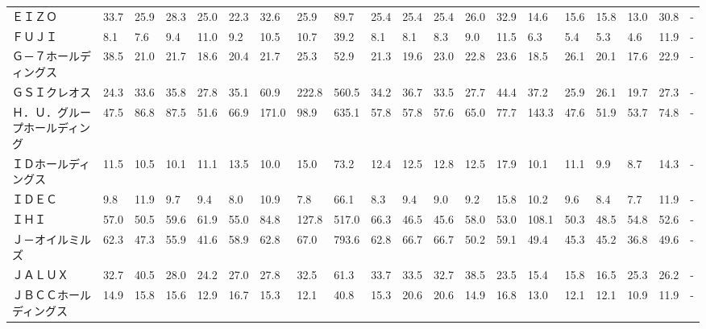\begin{tabular}{llllllllllllllllllll}
ＥＩＺＯ            &   33.7 &   25.9 &      28.3 &      25.0 &       22.3 &    32.6 &    25.9 &     89.7 &    25.4 &    25.4 &   25.4 &   26.0 &    32.9 &    14.6 &    15.6 &   15.8 &   13.0 &    30.8 &      - \\
ＦＵＪＩ            &    8.1 &    7.6 &       9.4 &      11.0 &        9.2 &    10.5 &    10.7 &     39.2 &     8.1 &     8.1 &    8.3 &    9.0 &    11.5 &     6.3 &     5.4 &    5.3 &    4.6 &    11.9 &      - \\
Ｇ－７ホールディングス     &   38.5 &   21.0 &      21.7 &      18.6 &       20.4 &    21.7 &    25.3 &     52.9 &    21.3 &    19.6 &   23.0 &   22.8 &    23.6 &    18.5 &    26.1 &   20.1 &   17.6 &    22.9 &      - \\
ＧＳＩクレオス         &   24.3 &   33.6 &      35.8 &      27.8 &       35.1 &    60.9 &   222.8 &    560.5 &    34.2 &    36.7 &   33.5 &   27.7 &    44.4 &    37.2 &    25.9 &   26.1 &   19.7 &    27.3 &      - \\
Ｈ．Ｕ．グループホールディング &   47.5 &   86.8 &      87.5 &      51.6 &       66.9 &   171.0 &    98.9 &    635.1 &    57.8 &    57.8 &   57.6 &   65.0 &    77.7 &   143.3 &    47.6 &   51.9 &   53.7 &    74.8 &      - \\
ＩＤホールディングス      &   11.5 &   10.5 &      10.1 &      11.1 &       13.5 &    10.0 &    15.0 &     73.2 &    12.4 &    12.5 &   12.8 &   12.5 &    17.9 &    10.1 &    11.1 &    9.9 &    8.7 &    14.3 &      - \\
ＩＤＥＣ            &    9.8 &   11.9 &       9.7 &       9.4 &        8.0 &    10.9 &     7.8 &     66.1 &     8.3 &     9.4 &    9.0 &    9.2 &    15.8 &    10.2 &     9.6 &    8.4 &    7.7 &    11.9 &      - \\
ＩＨＩ             &   57.0 &   50.5 &      59.6 &      61.9 &       55.0 &    84.8 &   127.8 &    517.0 &    66.3 &    46.5 &   45.6 &   58.0 &    53.0 &   108.1 &    50.3 &   48.5 &   54.8 &    52.6 &      - \\
Ｊ－オイルミルズ        &   62.3 &   47.3 &      55.9 &      41.6 &       58.9 &    62.8 &    67.0 &    793.6 &    62.8 &    66.7 &   66.7 &   50.2 &    59.1 &    49.4 &    45.3 &   45.2 &   36.8 &    49.6 &      - \\
ＪＡＬＵＸ           &   32.7 &   40.5 &      28.0 &      24.2 &       27.0 &    27.8 &    32.5 &     61.3 &    33.7 &    33.5 &   32.7 &   38.5 &    23.5 &    15.4 &    15.8 &   16.5 &   25.3 &    26.2 &      - \\
ＪＢＣＣホールディングス    &   14.9 &   15.8 &      15.6 &      12.9 &       16.7 &    15.3 &    12.1 &     40.8 &    15.3 &    20.6 &   20.6 &   14.9 &    16.8 &    13.0 &    12.1 &   12.1 &   10.9 &    11.9 &      - \\

\end{tabular}
